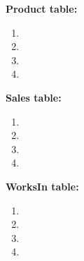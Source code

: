 \documentclass{article}
\begin{document}
  \par\textbf{Product table:}
  \begin{enumerate}[label=\roman*]
  	\item
  	\item
  	\item
  	\item
  \end{enumerate}
  \par\textbf{Sales table:}
  \begin{enumerate}[label=\roman*]
  	\item
  	\item
  	\item
  	\item
  \end{enumerate}
  \par\textbf{WorksIn table:}
  \begin{enumerate}[label=\roman*]
  	\item
  	\item
  	\item
  	\item
  \end{enumerate}
\end{document}
